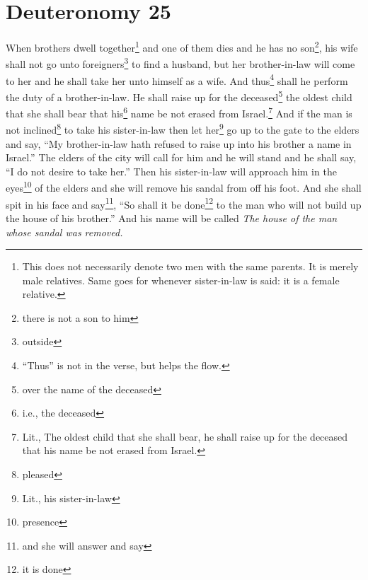 \section{Deuteronomy 25}\label{Deuteronomy 25}
\begin{enumerate}
     When brothers dwell together\footnote{This does not necessarily denote two men with the same parents. It is merely male relatives. Same goes for whenever sister-in-law is said: it is a female relative.} and one of them dies and he has no son\footnote{there is not a son to him}, his wife shall not go unto foreigners\footnote{outside} to find a husband, but her brother-in-law will come to her and he shall take her unto himself as a wife. And thus\footnote{``Thus'' is not in the verse, but helps the flow.} shall he perform the duty of a brother-in-law.%
     He shall raise up for the deceased\footnote{over the name of the deceased} the oldest child that she shall bear that his\footnote{i.e., the deceased} name be not erased from Israel.\footnote{Lit., The oldest child that she shall bear, he shall raise up for the deceased that his name be not erased from Israel.}%
     And if the man is not inclined\footnote{pleased} to take his sister-in-law then let her\footnote{Lit., his sister-in-law} go up to the gate to the elders and say, ``My brother-in-law hath refused to raise up into his brother a name in Israel.''%
     The elders of the city will call for him and he will stand and he shall say, ``I do not desire to take her.''%
     Then his sister-in-law will approach him in the eyes\footnote{presence} of the elders and she will remove his sandal from off his foot. And she shall spit in his face and say\footnote{and she will answer and say}, ``So shall it be done\footnote{it is done} to the man who will not build up the house of his brother.''%
     And his name will be called \emph{The house of the man whose sandal was removed.}%
\end{enumerate}
